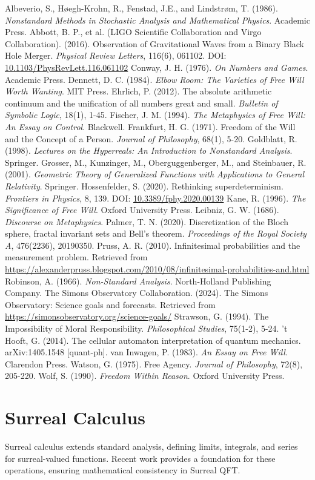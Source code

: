 \documentclass{article}
\begin{document}
\begin{thebibliography}{9}
 Albeverio, S., Høegh-Krohn, R., Fenstad, J.E., and Lindstrøm, T. (1986). \emph{Nonstandard Methods in Stochastic Analysis and Mathematical Physics}. Academic Press.
 Abbott, B. P., et al. (LIGO Scientific Collaboration and Virgo Collaboration). (2016). Observation of Gravitational Waves from a Binary Black Hole Merger. \emph{Physical Review Letters}, 116(6), 061102. DOI: \href{https://doi.org/10.1103/PhysRevLett.116.061102}{10.1103/PhysRevLett.116.061102}
 Conway, J. H. (1976). \emph{On Numbers and Games}. Academic Press.
 Dennett, D. C. (1984). \emph{Elbow Room: The Varieties of Free Will Worth Wanting}. MIT Press.
 Ehrlich, P. (2012). The absolute arithmetic continuum and the unification of all numbers great and small. \emph{Bulletin of Symbolic Logic}, 18(1), 1-45.
 Fischer, J. M. (1994). \emph{The Metaphysics of Free Will: An Essay on Control}. Blackwell.
 Frankfurt, H. G. (1971). Freedom of the Will and the Concept of a Person. \emph{Journal of Philosophy}, 68(1), 5-20.
 Goldblatt, R. (1998). \emph{Lectures on the Hyperreals: An Introduction to Nonstandard Analysis}. Springer.
 Grosser, M., Kunzinger, M., Oberguggenberger, M., and Steinbauer, R. (2001). \emph{Geometric Theory of Generalized Functions with Applications to General Relativity}. Springer.
 Hossenfelder, S. (2020). Rethinking superdeterminism. \emph{Frontiers in Physics}, 8, 139. DOI: \href{https://doi.org/10.3389/fphy.2020.00139}{10.3389/fphy.2020.00139}
 Kane, R. (1996). \emph{The Significance of Free Will}. Oxford University Press.
 Leibniz, G. W. (1686). \emph{Discourse on Metaphysics}.
 Palmer, T. N. (2020). Discretization of the Bloch sphere, fractal invariant sets and Bell's theorem. \emph{Proceedings of the Royal Society A}, 476(2236), 20190350.
 Pruss, A. R. (2010). Infinitesimal probabilities and the measurement problem. Retrieved from \url{https://alexanderpruss.blogspot.com/2010/08/infinitesimal-probabilities-and.html}
 Robinson, A. (1966). \emph{Non-Standard Analysis}. North-Holland Publishing Company.
 The Simons Observatory Collaboration. (2024). The Simons Observatory: Science goals and forecasts. Retrieved from \url{https://simonsobservatory.org/science-goals/}
 Strawson, G. (1994). The Impossibility of Moral Responsibility. \emph{Philosophical Studies}, 75(1-2), 5-24.
 't Hooft, G. (2014). The cellular automaton interpretation of quantum mechanics. arXiv:1405.1548 [quant-ph].
 van Inwagen, P. (1983). \emph{An Essay on Free Will}. Clarendon Press.
 Watson, G. (1975). Free Agency. \emph{Journal of Philosophy}, 72(8), 205-220.
 Wolf, S. (1990). \emph{Freedom Within Reason}. Oxford University Press.
\end{thebibliography}

\appendix
\section{Surreal Calculus}
Surreal calculus extends standard analysis, defining limits, integrals, and series for surreal-valued functions. Recent work \cite{Ehrlich2012} provides a foundation for these operations, ensuring mathematical consistency in Surreal QFT.
\end{document}
